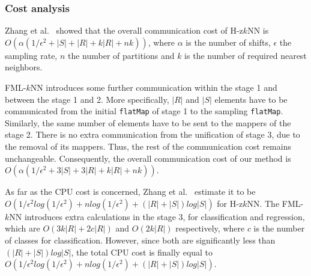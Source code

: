 \subsubsection{Cost analysis}
\label{par:cost}
Zhang et al.~\cite{zhang2012epk} showed that the overall communication cost of H-z$k$NN is $O(\alpha(1/\epsilon^2 + |S| + |R| + k|R| + nk))$, where $\alpha$ is the number of shifts, $\epsilon$ the sampling rate, $n$ the number of partitions and $k$ is the number of required nearest neighbors. 

FML-$k$NN introduces some further communication within the stage 1 and between the stage 1 and 2. More specifically, $|R|$ and $|S|$ elements have to be communicated from the initial \texttt{flatMap} of stage 1 to the sampling \texttt{flatMap}. Similarly, the same number of elements have to be sent to the mappers of the stage 2. There is no extra communication from the unification of stage 3, due to the removal of its mappers. Thus, the rest of the communication cost remains unchangeable. Consequently, the overall communication cost of our method is $O(\alpha(1/\epsilon^2 + 3|S| + 3|R| + k|R| + nk))$.

As far as the CPU cost is concerned, Zhang et al.~\cite{zhang2012epk} estimate it to be $O(1/\epsilon^2 log(1/\epsilon^2) + n log(1/\epsilon^2) + (|R| + |S|)log|S|)$ for H-z$k$NN. The FML-$k$NN introduces extra calculations in the stage 3, for classification and regression, which are $O(3k|R| + 2c|R|)$ and $O(2k|R|)$ respectively, where $c$ is the number of classes for classification. However, since both are significantly less than $(|R| + |S|)log|S|$, the total CPU cost is finally equal to $O(1/\epsilon^2 log(1/\epsilon^2) + n log(1/\epsilon^2) + (|R| + |S|)log|S|)$.